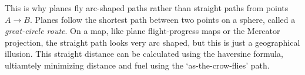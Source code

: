 This is why planes fly arc-shaped paths rather than straight paths from points $A \to B$. Planes follow the shortest path between two points on a sphere, called a \emph{great-circle route}. On a map, like plane flight-progress maps or the Mercator projection, the straight path looks very arc shaped, but this is just a geographical illusion. This straight distance can be calculated using the haversine formula, ultiamtely minimizing distance and fuel using the `as-the-crow-flies' path. 

